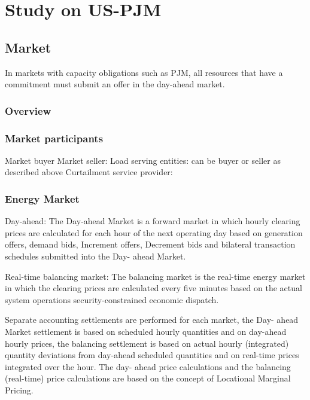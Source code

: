 \chapter{Study on US-PJM}

\section{Market}
In markets with capacity obligations such as PJM, all resources that have a commitment must submit an offer in the day-ahead market.
\subsection{Overview}
\subsection{Market participants}
Market buyer
Market seller: 
Load serving entities: can be buyer or seller as described above
Curtailment service provider:

\subsection{Energy Market}
Day-ahead:
The Day-ahead Market is a forward market in which hourly clearing prices are calculated for each hour of the next operating day based on generation offers, demand bids, Increment offers, Decrement bids and bilateral transaction schedules submitted into the Day- ahead Market.

Real-time balancing market:
The balancing market is the real-time energy market in which the clearing prices are calculated every five minutes based on the actual system operations security-constrained economic dispatch.

Separate accounting settlements are performed for each market, the Day- ahead Market settlement is based on scheduled hourly quantities and on day-ahead hourly prices, the balancing settlement is based on actual hourly (integrated) quantity deviations from day-ahead scheduled quantities and on real-time prices integrated over the hour. The day- ahead price calculations and the balancing (real-time) price calculations are based on the concept of Locational Marginal Pricing.

